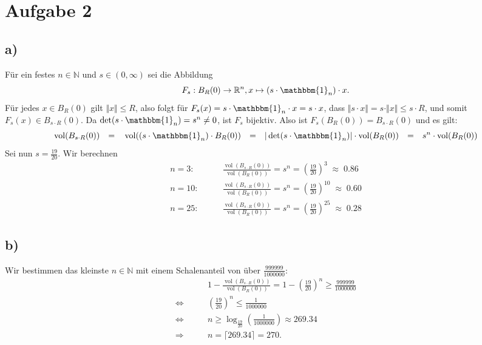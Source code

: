 \documentclass{article}
\newcommand{\NN}{\mathbb{N}}
\newcommand{\RR}{\mathbb{R}}
\newcommand{\imp}{\mathbb{\Rightarrow}}
\newcommand{\equ}{\mathbb{\Leftrightarrow}}
\newcommand{\eq}{\mathbb{\quad = \quad}}
\DeclareMathOperator{\vol}{vol}
\begin{document}
\newpage

\section*{Aufgabe 2}

\subsection*{a)}

Für ein festes $n \in \NN$ und $s \in (0, \infty)$
sei die Abbildung
$$
  F_s: B_{R}(0) \to \RR^n , x \mapsto (s \cdot \mathbbm{1}_n) \cdot x.
$$
Für jedes $x \in B_R(0)$ gilt $\Vert x \Vert \leq R$,
also folgt für $F_s(x) = s \cdot \mathbbm{1}_n \cdot x = s \cdot x$,
dass $\Vert s \cdot x \Vert = s \cdot \Vert x \Vert \leq s \cdot R$,
und somit $F_s(x) \in B_{s\cdot R}(0)$.
Da $\det(s \cdot \mathbbm{1}_n) = s^n \neq 0$,
ist $F_s$ bijektiv.
Also ist $F_s(B_{R}(0)) = B_{s \cdot R}(0)$ und es gilt:
$$
  \vol(B_{s \cdot R}(0)) \eq
  \vol((s \cdot \mathbbm{1}_n) \cdot B_{R}(0)) \eq
  |\det(s \cdot \mathbbm{1}_n)| \cdot \vol(B_R(0)) \eq
  s^n \cdot \vol(B_R(0))
$$
Sei nun $s = \frac{19}{20}$.
Wir berechnen
\begin{align*}
  n=3: \qquad  & \frac{\vol(B_{s\cdot R}(0))}{\vol(B_R(0))}
  = s^n = \left(\frac{19}{20}\right)^3 \;\approx\; 0.86     \\
  n=10: \qquad & \frac{\vol(B_{s\cdot R}(0))}{\vol(B_R(0))}
  = s^n = \left(\frac{19}{20}\right)^{10} \;\approx\; 0.60  \\
  n=25: \qquad & \frac{\vol(B_{s\cdot R}(0))}{\vol(B_R(0))}
  = s^n = \left(\frac{19}{20}\right)^{25} \;\approx\; 0.28
\end{align*}

\subsection*{b)}
Wir bestimmen das kleinste $n \in \NN$
mit einem Schalenanteil von über $\frac{999999}{1000000}$:
\begin{align*}
              & 1 -\frac{\vol(B_{s\cdot R}(0))}{\vol(B_R(0))} = 1- \left(\frac{19}{20}\right)^n
  \geq \frac{999999}{1000000}                                                                   \\
  \equ\qquad  & \left(\frac{19}{20}\right)^n \leq \frac{1}{1000000}                             \\
  \equ\qquad  & n \geq \log_{\frac{19}{20}}\left(\frac{1}{1000000}\right) \approx 269.34        \\
  \imp \qquad & n = \lceil 269.34 \rceil = 270.
\end{align*}
\end{document}
